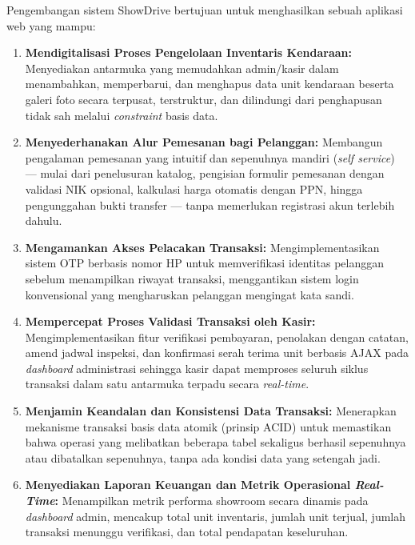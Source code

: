 \documentclass[11pt, a5paper]{article}
\begin{document}
Pengembangan sistem ShowDrive bertujuan untuk menghasilkan sebuah aplikasi web
yang mampu:

\begin{enumerate}[label=\alph*.]
  \item \textbf{Mendigitalisasi Proses Pengelolaan Inventaris Kendaraan:}
        Menyediakan antarmuka yang memudahkan admin/kasir dalam menambahkan,
        memperbarui, dan menghapus data unit kendaraan beserta galeri foto
        secara terpusat, terstruktur, dan dilindungi dari penghapusan tidak sah
        melalui \textit{constraint} basis data.

  \item \textbf{Menyederhanakan Alur Pemesanan bagi Pelanggan:} Membangun
        pengalaman pemesanan yang intuitif dan sepenuhnya mandiri (\textit{self
        service}) — mulai dari penelusuran katalog, pengisian formulir pemesanan
        dengan validasi NIK opsional, kalkulasi harga otomatis dengan PPN,
        hingga pengunggahan bukti transfer — tanpa memerlukan registrasi akun
        terlebih dahulu.

  \item \textbf{Mengamankan Akses Pelacakan Transaksi:} Mengimplementasikan
        sistem OTP berbasis nomor HP untuk memverifikasi identitas pelanggan
        sebelum menampilkan riwayat transaksi, menggantikan sistem login
        konvensional yang mengharuskan pelanggan mengingat kata sandi.

  \item \textbf{Mempercepat Proses Validasi Transaksi oleh Kasir:}
        Mengimplementasikan fitur verifikasi pembayaran, penolakan dengan catatan,
        amend jadwal inspeksi, dan konfirmasi serah terima unit berbasis AJAX
        pada \textit{dashboard} administrasi sehingga kasir dapat memproses
        seluruh siklus transaksi dalam satu antarmuka terpadu secara
        \textit{real-time}.

  \item \textbf{Menjamin Keandalan dan Konsistensi Data Transaksi:} Menerapkan
        mekanisme transaksi basis data atomik (prinsip ACID) untuk memastikan
        bahwa operasi yang melibatkan beberapa tabel sekaligus berhasil
        sepenuhnya atau dibatalkan sepenuhnya, tanpa ada kondisi data yang
        setengah jadi.

  \item \textbf{Menyediakan Laporan Keuangan dan Metrik Operasional
        \textit{Real-Time}:} Menampilkan metrik performa showroom secara dinamis
        pada \textit{dashboard} admin, mencakup total unit inventaris, jumlah
        unit terjual, jumlah transaksi menunggu verifikasi, dan total pendapatan
        keseluruhan.
\end{enumerate}
\end{document}
